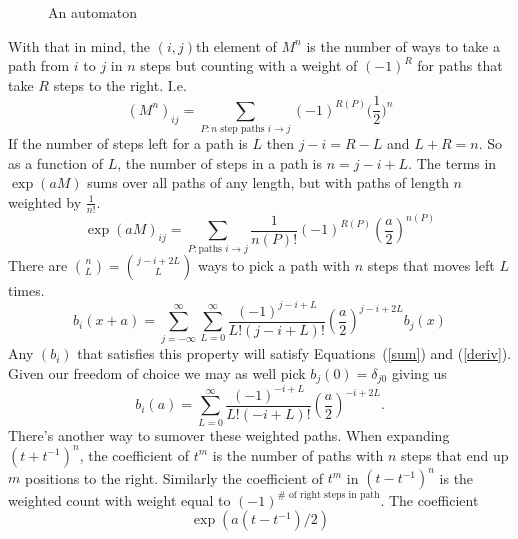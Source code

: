 \documentclass{article}
\begin{document}
\begin{figure}
\centering
{}
\caption{An automaton}
\label{automaton}
\end{figure}
With that in mind, the $(i,j)$th element of $M^n$ is the number of ways to take a path from $i$ to $j$ in $n$ steps but counting with a weight of $(-1)^R$ for paths that take $R$ steps to the right.
I.e.
\[
(M^n)_{ij} = \sum_{P:\mbox{$n$ step paths $i\rightarrow j$}} (-1)^{R(P)}\Big(\frac{1}{2}\Big)^n
\]
If the number of steps left for a path is $L$ then $j-i=R-L$ and $L+R=n$.
So as a function of $L$, the number of steps in a path is $n=j-i+L$.
The terms in $\exp(aM)$ sums over all paths of any length, but with paths of length $n$ weighted by $\frac{1}{n!}$.
\[
\exp(aM)_{ij} = \sum_{P:\mbox{paths }i\rightarrow j} \frac{1}{n(P)!}(-1)^{R(P)} (\frac{a}{2})^{n(P)}
\]
There are $\binom{n}{L}=\binom{j-i+2L}{L}$ ways to pick a path with $n$ steps that moves left $L$ times.
\[
b_i(x+a) = \sum_{j=-\infty}^\infty\sum_{L=0}^\infty\frac{(-1)^{j-i+L}}{L!(j-i+L)!}(\frac{a}{2})^{j-i+2L} b_j(x)
\]
Any $(b_i)$ that satisfies this property will satisfy Equations~(\ref{sum}) and (\ref{deriv}).
Given our freedom of choice we may as well pick $b_j(0)=\delta_{j0}$ giving us
\[
b_i(a) = \sum_{L=0}^\infty\frac{(-1)^{-i+L}}{L!(-i+L)!}(\frac{a}{2})^{-i+2L} .
\]
There's another way to sumover these weighted paths.
When expanding $(t+t^{-1})^n$, the coefficient of $t^m$ is the number of paths with $n$ steps that end up $m$ positions to the right.
Similarly the coefficient of $t^m$ in $(t-t^{-1})^n$ is the weighted count with weight equal to $(-1)^{\mbox{$\#$ of right steps in path}}$.
The coefficient
\[
\exp(a(t-t^{-1})/2)
\]
\end{document}
